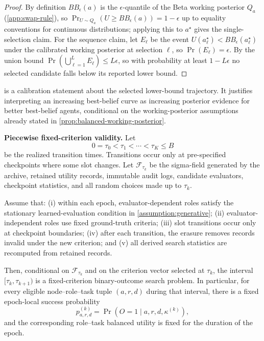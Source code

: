 \begin{proof}
By definition \(BB_\epsilon(a)\) is the \(\epsilon\)-quantile of the Beta working posterior \(Q_a\) (\cref{app:swap-rule}), so \(\Pr_{U\sim Q_a}(U\ge BB_\epsilon(a))=1-\epsilon\) up to equality conventions for continuous distributions; applying this to \(a^\star\) gives the single-selection claim. For the sequence claim, let \(E_\ell\) be the event \(U(a^\star_\ell)<BB_\epsilon(a^\star_\ell)\) under the calibrated working posterior at selection \(\ell\), so \(\Pr(E_\ell)=\epsilon\). By the union bound \(\Pr(\bigcup_{\ell=1}^L E_\ell)\le L\epsilon\), so with probability at least \(1-L\epsilon\) no selected candidate falls below its reported lower bound.
\end{proof}

\begin{remark}
 is a calibration statement about the selected lower-bound trajectory. It justifies interpreting an increasing best-belief curve as increasing posterior evidence for better best-belief agents, conditional on the working-posterior assumptions already stated in \cref{prop:balanced-working-posterior}.
\end{remark}

\noindent\textbf{Piecewise fixed-criterion validity.}
Let
\[
0=\tau_0 < \tau_1 < \cdots < \tau_K \le B
\]
be the realized transition times. Transitions occur only at pre-specified checkpoints where some slot changes. Let \(\mathcal{F}_{\tau_k}\) be the sigma-field generated by the archive, retained utility records, immutable audit logs, candidate evaluators, checkpoint statistics, and all random choices made up to \(\tau_k\).

\begin{proposition}
\label{prop:piecewise-fixed-validity}
Assume that: (i) within each epoch, evaluator-dependent roles satisfy the stationary learned-evaluation condition in \cref{assumption:generative}; (ii) evaluator-independent roles use fixed ground-truth criteria; (iii) slot transitions occur only at checkpoint boundaries; (iv) after each transition, the erasure removes records invalid under the new criterion; and (v) all derived search statistics are recomputed from retained records.

Then, conditional on \(\mathcal{F}_{\tau_k}\) and on the criterion vector selected at \(\tau_k\), the interval \([\tau_k,\tau_{k+1})\) is a fixed-criterion binary-outcome search problem. In particular, for every eligible node--role--task tuple \((a,r,d)\) during that interval, there is a fixed epoch-local success probability
\[
p_{a,r,d}^{(k)} = \Pr(O=1 \mid a,r,d,\kappa^{(k)}),
\]
and the corresponding role--task balanced utility is fixed for the duration of the epoch.
\end{proposition}

